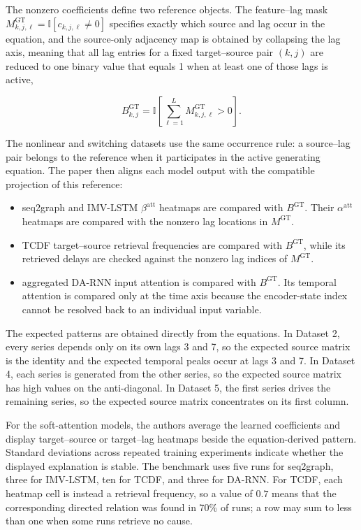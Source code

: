 The nonzero coefficients define two reference objects. The feature--lag mask
$M^{\mathrm{GT}}_{k,j,\ell}=\mathbb{I}[c_{k,j,\ell}\neq 0]$ specifies exactly
which source and lag occur in the equation, and the source-only adjacency map
is obtained by collapsing the lag axis, meaning that all lag entries for a
fixed target--source pair $(k,j)$ are reduced to one binary value that equals 1
when at least one of those lags is active,

\begin{equation}
    B^{\mathrm{GT}}_{k,j}
    = \mathbb{I}\!\left[\sum_{\ell=1}^{L}
      M^{\mathrm{GT}}_{k,j,\ell}>0\right].
\end{equation}

The nonlinear and switching datasets use the same occurrence rule: a source--lag
pair belongs to the reference when it participates in the active generating
equation. The paper then aligns each model output with the compatible projection
of this reference:

\begin{itemize}
    \item seq2graph and IMV-LSTM $\beta^{\mathrm{att}}$ heatmaps are compared
    with $B^{\mathrm{GT}}$. Their $\alpha^{\mathrm{att}}$ heatmaps are compared
    with the nonzero lag locations in $M^{\mathrm{GT}}$.
    \item TCDF target--source retrieval frequencies are compared with
    $B^{\mathrm{GT}}$, while its retrieved delays are checked against the
    nonzero lag indices of $M^{\mathrm{GT}}$.
    \item aggregated DA-RNN input attention is compared with
    $B^{\mathrm{GT}}$. Its temporal attention is compared only at the time axis
    because the encoder-state index cannot be resolved back to an individual
    input variable.
\end{itemize}

The expected patterns are obtained directly from the equations. In Dataset 2,
every series depends only on its own lags 3 and 7, so the expected source matrix
is the identity and the expected temporal peaks occur at lags 3 and 7. In
Dataset 4, each series is generated from the other series, so the expected
source matrix has high values on the anti-diagonal. In Dataset 5, the first
series drives the remaining series, so the expected source matrix concentrates
on its first column.

For the soft-attention models, the authors average the learned coefficients and
display target--source or target--lag heatmaps beside the equation-derived
pattern. Standard deviations across repeated training experiments indicate
whether the displayed explanation is stable. The benchmark uses five runs for
seq2graph, three for IMV-LSTM, ten for TCDF, and three for DA-RNN. For TCDF,
each heatmap cell is instead a retrieval frequency, so a value of $0.7$ means
that the corresponding directed relation was found in 70\% of runs; a row may
sum to less than one when some runs retrieve no cause.

